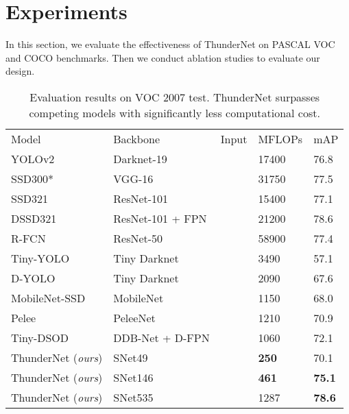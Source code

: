 

\section{Experiments}

In this section, we evaluate the effectiveness of ThunderNet on PASCAL VOC \cite{everingham2010pascal} and COCO \cite{lin2014microsoft} benchmarks.
Then we conduct ablation studies to evaluate our design.

\begin{table*}[!t]
\scriptsize
\centering
\begin{tabular}{p{11em}|P{10em}|P{8em}|P{6em}|P{4em}}
Model & Backbone & Input & MFLOPs & mAP \\ 
YOLOv2 \cite{redmon2017yolo9000} & Darknet-19 &  & 17400 & 76.8 \\
SSD300* \cite{liu2016ssd} & VGG-16 &  & 31750 & 77.5 \\
SSD321 \cite{fu2017dssd} & ResNet-101 &  & 15400 & 77.1 \\
DSSD321 \cite{fu2017dssd} & ResNet-101 + FPN &  & 21200 & 78.6 \\
R-FCN \cite{dai2016r} & ResNet-50 &  & 58900 & 77.4 \\ \hline
Tiny-YOLO \cite{redmon2017yolo9000} & Tiny Darknet &  & 3490 & 57.1 \\
D-YOLO \cite{mehta2018object} & Tiny Darknet &  & 2090 & 67.6 \\
MobileNet-SSD \cite{wang2018pelee} & MobileNet &  & 1150 & 68.0 \\
Pelee \cite{wang2018pelee} & PeleeNet &  & 1210 & 70.9 \\
Tiny-DSOD \cite{li2018tiny} & DDB-Net + D-FPN &  & 1060 & 72.1 \\ \hline
ThunderNet (\emph{ours}) & SNet49 &  & \textbf{250} & 70.1 \\
ThunderNet (\emph{ours}) & SNet146 &  & \textbf{461} & \textbf{75.1} \\
ThunderNet (\emph{ours}) & SNet535 &  & 1287 & \textbf{78.6} \\
\end{tabular}
\vspace{3pt}
\caption{
Evaluation results on VOC 2007 test.
ThunderNet surpasses competing models with significantly less computational cost.
}
\label{table:results-voc}
\end{table*}

